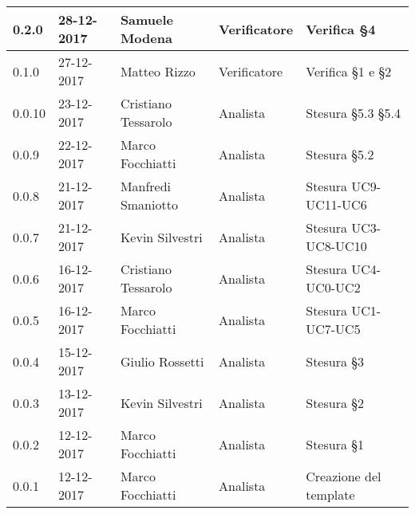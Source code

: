 \documentclass[./AnalisideiRequisiti.tex]{subfiles}
\begin{document}
{\begin{longtable}{|p{20mm}|p{20mm}|p{40mm}|p{30mm}|p{50mm}|}
	   	0.2.0 & 28-12-2017 & Samuele Modena & Verificatore & Verifica §4\\ \hline
	   	0.1.0 & 27-12-2017 & Matteo Rizzo & Verificatore & Verifica §1 e §2  \\ \hline		
		0.0.10 & 23-12-2017 & Cristiano Tessarolo & Analista & Stesura §5.3 §5.4\\ \hline		
		0.0.9 & 22-12-2017 & Marco Focchiatti & Analista & Stesura §5.2 \\ \hline		
		0.0.8 & 21-12-2017 & Manfredi Smaniotto & Analista & Stesura UC9-UC11-UC6\\ \hline
		0.0.7 & 21-12-2017 & Kevin Silvestri & Analista & Stesura UC3-UC8-UC10\\ \hline
		0.0.6 & 16-12-2017 & Cristiano Tessarolo & Analista & Stesura UC4-UC0-UC2\\ \hline
		0.0.5 & 16-12-2017 & Marco Focchiatti & Analista & Stesura UC1-UC7-UC5\\ \hline
		0.0.4 & 15-12-2017 & Giulio Rossetti & Analista & Stesura §3\\ \hline
		0.0.3 & 13-12-2017 & Kevin Silvestri & Analista & Stesura §2\\ \hline
		0.0.2 & 12-12-2017 & Marco Focchiatti & Analista & Stesura §1\\ \hline
		0.0.1 & 12-12-2017 & Marco Focchiatti & Analista & Creazione del template\\ \hline
	\end{longtable}

}	
\end{document}
